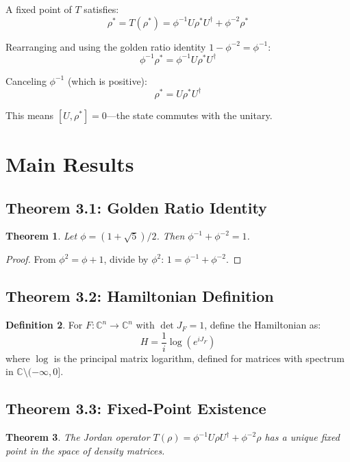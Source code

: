 \documentclass[11pt,a4paper]{article}
\theoremstyle{plain}
\newtheorem{theorem}{Theorem}[section]
\theoremstyle{definition}
\newtheorem{definition}[theorem]{Definition}
\newcommand{\CC}{\mathbb{C}}
\begin{document}
A fixed point of $T$ satisfies:
$$\rho^* = T(\rho^*) = \phi^{-1} U \rho^* U^\dagger + \phi^{-2} \rho^*$$

Rearranging and using the golden ratio identity $1 - \phi^{-2} = \phi^{-1}$:
$$\phi^{-1} \rho^* = \phi^{-1} U \rho^* U^\dagger$$

Canceling $\phi^{-1}$ (which is positive):
$$\rho^* = U \rho^* U^\dagger$$

This means $[U, \rho^*] = 0$—the state commutes with the unitary.

\section{Main Results}

\subsection{Theorem 3.1: Golden Ratio Identity}

\begin{theorem}
Let $\phi = (1 + \sqrt{5})/2$. Then $\phi^{-1} + \phi^{-2} = 1$.
\end{theorem}

\begin{proof}
From $\phi^2 = \phi + 1$, divide by $\phi^2$: $1 = \phi^{-1} + \phi^{-2}$.
\end{proof}

\subsection{Theorem 3.2: Hamiltonian Definition}

\begin{definition}
For $F : \CC^n \to \CC^n$ with $\det J_F = 1$, define the Hamiltonian as:
$$H = \frac{1}{i} \log(e^{iJ_F})$$
where $\log$ is the principal matrix logarithm, defined for matrices with spectrum in $\CC \setminus (-\infty, 0]$.
\end{definition}

\subsection{Theorem 3.3: Fixed-Point Existence}

\begin{theorem}
The Jordan operator $T(\rho) = \phi^{-1} U \rho U^\dagger + \phi^{-2} \rho$ has a unique fixed point in the space of density matrices.
\end{theorem}
\end{document}
